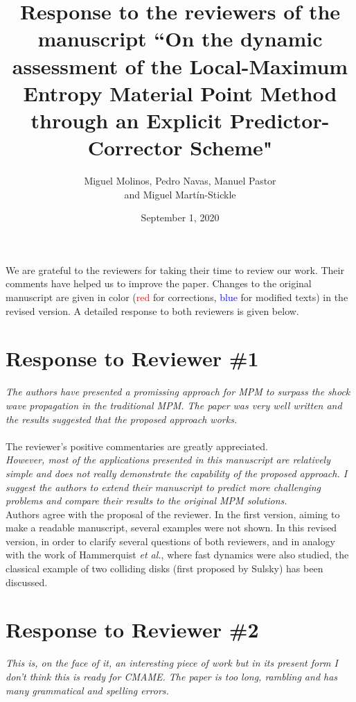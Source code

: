 \documentclass[12pt]{article}
\title{Response to the reviewers of the manuscript ``On the dynamic assessment of the Local-Maximum Entropy Material Point Method through an Explicit Predictor-Corrector Scheme"}
\author{Miguel Molinos, Pedro Navas, Manuel Pastor\\
and Miguel Mart\'in-Stickle}
\date{September 1, 2020}
\begin{document}
\maketitle

We  are grateful to the reviewers for taking their time  to review our work. Their comments have helped us to improve the paper. Changes to the original manuscript are given in  color (\textcolor{red}{red} for corrections, \textcolor{blue}{blue} for modified texts)  in the revised version.  A detailed response to both reviewers is given below.

\section*{Response to Reviewer \#1}
{\it
The authors have presented a promissing approach for MPM to surpass the shock wave propagation in the traditional MPM. The paper was very well written and the results suggested that the proposed approach works.
}
\\
\\
The reviewer's positive commentaries are greatly appreciated.
\\
\textit{However, most of the applications presented in this manuscript are relatively simple and does not really demonstrate the capability of the proposed approach. I suggest the authors to extend their manuscript to predict more challenging problems and compare their results to the original MPM solutions.}\\

Authors agree with the proposal of the reviewer. In the first version, aiming to make a readable manuscript, several examples were not shown. In this revised version, in order to clarify several questions of both reviewers, and in analogy with the work of Hammerquist \textit{et al.}\cite{HAMMERQUIST2017724}, where fast dynamics were also studied, the classical example of two colliding disks (first proposed by Sulsky) has been discussed.


\hspace{5mm}



\section*{Response to Reviewer \#2}

\textit {This is, on the face of it, an interesting piece of work but in its present form I don't think this is ready for CMAME. The paper is too long, rambling and has many grammatical and spelling errors. }\\
\end{document}
